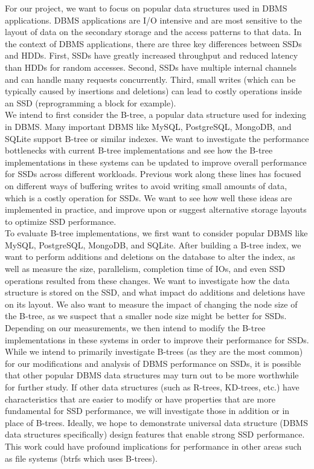 For our project, we want to focus on popular data structures used in DBMS applications.
DBMS applications are I/O intensive and are most sensitive to the layout of data on the secondary storage and the access patterns to that data.
In the context of DBMS applications, there are three key differences between SSDs and HDDs.
First, SSDs have greatly increased throughput and reduced latency than HDDs for random accesses.
Second, SSDs have multiple internal channels and can handle many requests concurrently.
Third, small writes (which can be typically caused by insertions and deletions) can lead to costly operations inside an SSD (reprogramming a block for example).\\

We intend to first consider the B-tree, a popular data structure used for indexing in DBMS.
Many important DBMS like MySQL, PostgreSQL, MongoDB, and SQLite support B-tree or similar indexes.
We want to investigate the performance bottlenecks with current B-tree implementations and see how the B-tree implementations in these systems can be updated to improve overall performance for SSDs across different workloads.
Previous work along these lines has focused on different ways of buffering writes to avoid writing small amounts of data, which is a costly operation for SSDs.
We want to see how well these ideas are implemented in practice, and improve upon or suggest alternative storage layouts to optimize SSD performance.\\

To evaluate B-tree implementations, we first want to consider popular DBMS like MySQL, PostgreSQL, MongoDB, and SQLite.
After building a B-tree index, we want to perform additions and deletions on the database to alter the index, as well as measure the size, parallelism, completion time of IOs, and even SSD operations resulted from these changes.
We want to investigate how the data structure is stored on the SSD, and what impact do additions and deletions have on its layout.
We also want to measure the impact of changing the node size of the B-tree, as we suspect that a smaller node size might be better for SSDs.
Depending on our measurements, we then intend to modify the B-tree implementations in these systems in order to improve their performance for SSDs.\\

While we intend to primarily investigate B-trees (as they are the most common) for our modifications and analysis of DBMS performance on SSDs, it is possible that other popular DBMS data structures may turn out to be more worthwhile for further study.
If other data structures (such as R-trees, KD-trees, etc.) have characteristics that are easier to modify or have properties that are more fundamental for SSD performance, we will investigate those in addition or in place of B-trees.
Ideally, we hope to demonstrate universal data structure (DBMS data structures specifically) design features that enable strong SSD performance. This work could have profound implications for performance in other areas such as file systems (btrfs which uses B-trees).\\
















